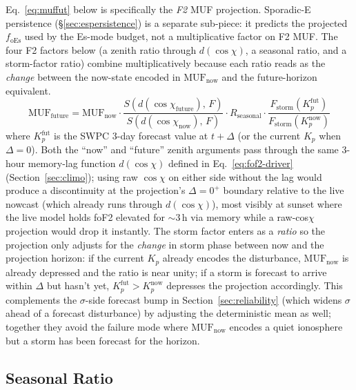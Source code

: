\documentclass[11pt,a4paper]{article}
\begin{document}
Eq.~\ref{eq:muffut} below is specifically the \emph{F2} MUF
projection.  Sporadic-E persistence (\S\ref{sec:espersistence})
is a separate sub-piece: it predicts the projected
$f_{\text{oEs}}$ used by the Es-mode budget, not a multiplicative
factor on F2 MUF.  The four F2 factors below (a zenith ratio
through $d(\cos\chi)$, a seasonal ratio, and a storm-factor
ratio) combine multiplicatively because each ratio reads as the
\emph{change} between the now-state encoded in
$\text{MUF}_{\text{now}}$ and the future-horizon equivalent.
\begin{equation}\label{eq:muffut}
  \text{MUF}_{\text{future}} = \text{MUF}_{\text{now}} \cdot
    \frac{S(d(\cos\chi_{\text{future}}),\, F)}{S(d(\cos\chi_{\text{now}}),\, F)}
    \cdot R_{\text{seasonal}} \cdot \frac{F_{\text{storm}}(K_p^{\text{fut}})}
                                          {F_{\text{storm}}(K_p^{\text{now}})}
\end{equation}
where $K_p^{\text{fut}}$ is the SWPC 3-day forecast value at
$t + \Delta$ (or the current $K_p$ when $\Delta = 0$).  Both the
``now'' and ``future'' zenith arguments pass through the same
3-hour memory-lag function $d(\cos\chi)$ defined in
Eq.~\ref{eq:fof2-driver} (Section~\ref{sec:climo}); using raw
$\cos\chi$ on either side without the lag would produce a
discontinuity at the projection's $\Delta = 0^+$ boundary
relative to the live nowcast (which already runs through
$d(\cos\chi)$), most visibly at sunset where the live model holds
foF2 elevated for ${\sim}3$\,h via memory while a raw-cos$\chi$
projection would drop it instantly.  The storm factor enters as a
\emph{ratio} so the projection only adjusts for the \emph{change}
in storm phase between now and the projection horizon: if the
current $K_p$ already encodes the disturbance,
$\text{MUF}_{\text{now}}$ is already depressed and the ratio is
near unity; if a storm is forecast to arrive within $\Delta$ but
hasn't yet, $K_p^{\text{fut}} > K_p^{\text{now}}$ depresses the
projection accordingly. This complements the $\sigma$-side
forecast bump in Section~\ref{sec:reliability} (which widens
$\sigma$ ahead of a forecast disturbance) by adjusting the
deterministic mean as well; together they avoid the failure mode
where $\text{MUF}_{\text{now}}$ encodes a quiet ionosphere but a
storm has been forecast for the horizon.

\subsection{Seasonal Ratio}\label{sec:seasonalratio}
\end{document}
